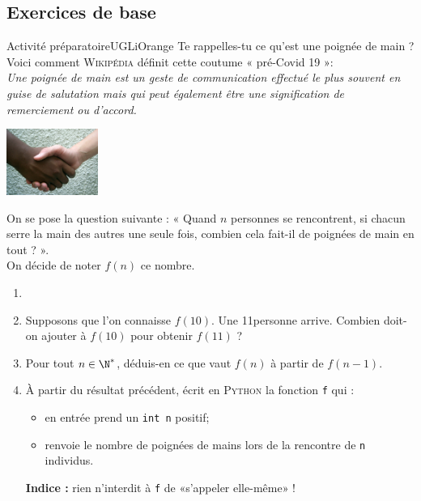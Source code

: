 \documentclass[10pt,firamath,cours]{nsi}
\begin{document}
\subsection*{Exercices de base}

\begin{encadrecolore}{Activité préparatoire}{UGLiOrange}
	Te rappelles-tu ce qu'est une poignée de main ? Voici comment \textsc{Wikipédia} définit cette coutume « pré-Covid 19 »:\\
	\textit{Une poignée de main est un geste de communication effectué le plus souvent en guise de salutation mais qui peut également être une signification de remerciement ou d'accord.}
	\begin{center}
		\includegraphics[width=3cm]{img/poignee.jpg}
	\end{center}
	On se pose la question suivante : « Quand $n$ personnes se rencontrent, si chacun serre la main des autres une seule fois, combien cela fait-il de poignées de main en tout ? ».\\
	On décide de noter $f(n)$ ce nombre.
	\begin{enumerate}
		\item 	{}
		\item 	Supposons que l'on connaisse $f(10)$. Une 11\eme personne arrive. Combien doit-on ajouter à $f(10)$ pour obtenir $f(11)$ ?
		\item   Pour tout $n\in\N^*$, déduis-en ce que vaut $f(n)$ à partir de $f(n-1)$.
		\item   À partir du résultat précédent, écrit en \textsc{Python} la fonction \texttt{f} qui :
		      \begin{itemize}
			      \item 	en entrée prend un \texttt{int n} positif;
			      \item 	renvoie le nombre de poignées de mains lors de la rencontre de \texttt{n} individus.
		      \end{itemize}
		      \textbf{Indice :} rien n'interdit à \texttt{f} de «s'appeler elle-même» !
	\end{enumerate}
\end{encadrecolore}
\end{document}
